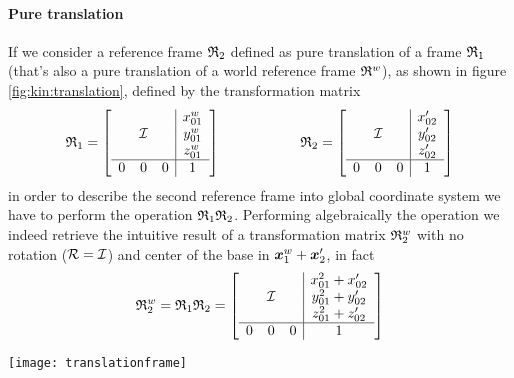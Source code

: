 		\paragraph{Pure translation} If we consider a reference frame $\mathfrak {R}_{2}$ defined as pure translation of a frame $\mathfrak {R}_{1}$ (that's also a pure translation of a world reference frame $\mathfrak{R}^w$), as shown in figure \ref{fig:kin:translation}, defined by the transformation matrix 
		\[ \mathfrak {R}_{1} = \begin{bmatrix}  \begin{array}{c c c | c}  &&& x_{01}^w \\ & \mathcal I&& y_{01}^w \\ &&& z_{01}^w \\ \hline 0 & 0 & 0 & 1  \end{array} \end{bmatrix} \hspace{2cm} \mathfrak {R}_{2} = \begin{bmatrix}  \begin{array}{c c c | c}  &&& x_{02}' \\ & \mathcal I&& y_{02}' \\ &&& z_{02}' \\ \hline 0 & 0 & 0 & 1  \end{array} \end{bmatrix} \]
		in order to describe the second reference frame into global coordinate system we have to perform the operation $\mathfrak {R}_{1} \mathfrak {R}_{2}$. Performing algebraically the operation we indeed retrieve the intuitive result of a transformation matrix $\mathfrak {R}_{2}^w$ with no rotation ($\mathcal R = \mathcal I$) and center of the base in  $\boldsymbol{x}_1^w + \boldsymbol{x}_2'$, in fact
		\[ \mathfrak {R}_{2}^w = \mathfrak {R}_{1}\mathfrak {R}_{2} = \begin{bmatrix}  \begin{array}{c c c | c}  &&& x_{01}^2 + x_{02}' \\ & \mathcal I&& y_{01}^2 + y_{02}' \\ &&& z_{01}^2 + z_{02}' \\ \hline 0 & 0 & 0 & 1  \end{array} \end{bmatrix} \]
		
		\begin{SCfigure}[2][bht]
			\centering \texttt{[image: translationframe]}
			\caption{multiple transformations of pure translation; in this case, for sake of simplicity, the planar case has been considered.} \label{fig:kin:translation}
		\end{SCfigure}
	
